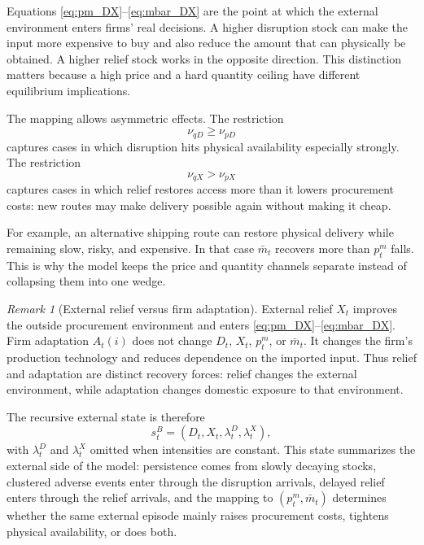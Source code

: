 ﻿\documentclass[12pt]{article}
\theoremstyle{remark}
\newtheorem{remark}{Remark}
\begin{document}
Equations \eqref{eq:pm_DX}--\eqref{eq:mbar_DX} are the point at which the external environment
enters firms' real decisions. A higher disruption stock can make the input more expensive to buy
and also reduce the amount that can physically be obtained. A higher relief stock works in the
opposite direction. This distinction matters because a high price and a hard quantity ceiling have
different equilibrium implications.

The mapping allows asymmetric effects. The restriction
\begin{equation}
    \nu_{qD}\ge \nu_{pD}
    \label{eq:D_asymmetry}
\end{equation}
captures cases in which disruption hits physical availability especially strongly. The restriction
\begin{equation}
    \nu_{qX}>\nu_{pX}
    \label{eq:X_asymmetry}
\end{equation}
captures cases in which relief restores access more than it lowers procurement costs: new routes
may make delivery possible again without making it cheap.

For example, an alternative shipping route can restore physical delivery while remaining slow,
risky, and expensive. In that case $\bar m_t$ recovers more than $p_t^m$ falls. This is why the
model keeps the price and quantity channels separate instead of collapsing them into one wedge.

\begin{remark}[External relief versus firm adaptation]\label{rem:relief_vs_adaptation}
External relief $X_t$ improves the outside procurement environment and enters
\eqref{eq:pm_DX}--\eqref{eq:mbar_DX}. Firm adaptation $A_t(i)$ does not change $D_t$, $X_t$,
$p_t^m$, or $\bar m_t$. It changes the firm's production technology and reduces dependence on the
imported input. Thus relief and adaptation are distinct recovery forces: relief changes the
external environment, while adaptation changes domestic exposure to that environment.
\end{remark}

The recursive external state is therefore
\begin{equation}
    s_t^B=(D_t,X_t,\lambda_t^D,\lambda_t^X),
    \label{eq:external_state}
\end{equation}
with $\lambda_t^D$ and $\lambda_t^X$ omitted when intensities are constant. This state summarizes
the external side of the model: persistence comes from slowly decaying stocks, clustered adverse
events enter through the disruption arrivals, delayed relief enters through the relief arrivals,
and the mapping to $(p_t^m,\bar m_t)$ determines whether the same external episode mainly raises
procurement costs, tightens physical availability, or does both.
\end{document}
